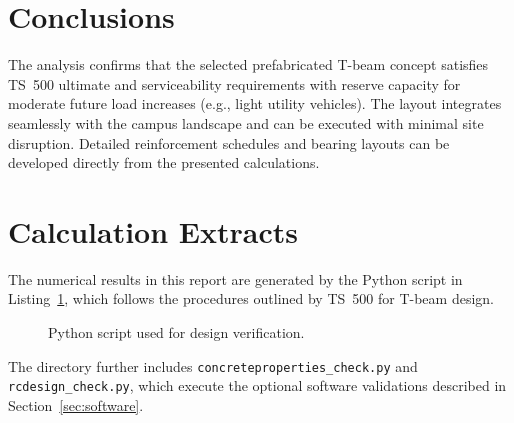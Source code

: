 \documentclass[12pt,a4paper]{report}
\begin{document}
\section{Conclusions}
The analysis confirms that the selected prefabricated T-beam concept satisfies TS~500 ultimate and serviceability requirements with reserve capacity for moderate future load increases (e.g., light utility vehicles). The layout integrates seamlessly with the campus landscape and can be executed with minimal site disruption. Detailed reinforcement schedules and bearing layouts can be developed directly from the presented calculations.

\appendix
\section{Calculation Extracts}\label{app:python}
The numerical results in this report are generated by the Python script in Listing~\ref{lst:python}, which follows the procedures outlined by TS~500 for T-beam design.

\begin{figure}[h]
\centering
\begin{minipage}{0.95\linewidth}
\scriptsize

\end{minipage}
\caption{Python script used for design verification.}
\label{lst:python}
\end{figure}

The directory further includes \texttt{concreteproperties\_check.py} and \texttt{rcdesign\_check.py}, which execute the optional software validations described in Section~\ref{sec:software}.
\end{document}
